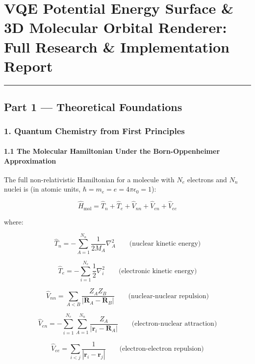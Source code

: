 \documentclass[
  11pt,
]{report}
\author{}
\date{}
\begin{document}
\chapter{VQE Potential Energy Surface \& 3D Molecular Orbital Renderer:
Full Research \& Implementation
Report}\label{vqe-potential-energy-surface-3d-molecular-orbital-renderer-full-research-implementation-report}

\begin{center}\rule{0.5\linewidth}{0.5pt}\end{center}

\section{Part 1 --- Theoretical
Foundations}\label{part-1-theoretical-foundations}

\subsection{1. Quantum Chemistry from First
Principles}\label{quantum-chemistry-from-first-principles}

\subsubsection{1.1 The Molecular Hamiltonian Under the Born-Oppenheimer
Approximation}\label{the-molecular-hamiltonian-under-the-born-oppenheimer-approximation}

The full non-relativistic Hamiltonian for a molecule with \(N_e\)
electrons and \(N_n\) nuclei is (in atomic units,
\(\hbar = m_e = e = 4\pi\epsilon_0 = 1\)):

\[\hat{H}_{\text{mol}} = \hat{T}_n + \hat{T}_e + \hat{V}_{nn} + \hat{V}_{en} + \hat{V}_{ee}\]

where:

\[\hat{T}_n = -\sum_{A=1}^{N_n} \frac{1}{2M_A}\nabla_A^2 \qquad \text{(nuclear kinetic energy)}\]

\[\hat{T}_e = -\sum_{i=1}^{N_e} \frac{1}{2}\nabla_i^2 \qquad \text{(electronic kinetic energy)}\]

\[\hat{V}_{nn} = \sum_{A<B} \frac{Z_A Z_B}{|\mathbf{R}_A - \mathbf{R}_B|} \qquad \text{(nuclear-nuclear repulsion)}\]

\[\hat{V}_{en} = -\sum_{i=1}^{N_e}\sum_{A=1}^{N_n} \frac{Z_A}{|\mathbf{r}_i - \mathbf{R}_A|} \qquad \text{(electron-nuclear attraction)}\]

\[\hat{V}_{ee} = \sum_{i<j} \frac{1}{|\mathbf{r}_i - \mathbf{r}_j|} \qquad \text{(electron-electron repulsion)}\]
\end{document}
